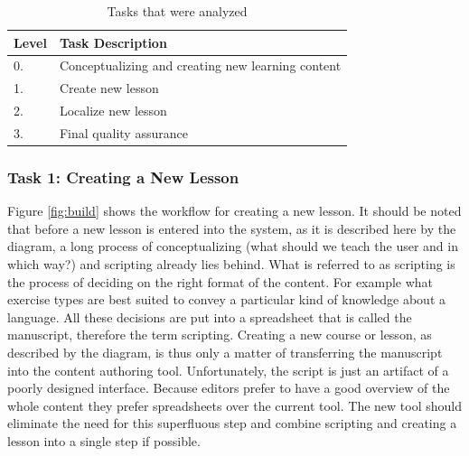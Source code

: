 \begin{table}[h]
\centering
\begin{tabular}{|l|l|}
\hline
\rowcolor[HTML]{EFEFEF}
{\bf Level} & {\bf Task Description}      \\ \hline
0. & Conceptualizing and creating new learning content \\ \hline
1. & Create new lesson           \\
2. & Localize new lesson         \\
3. & Final quality assurance        \\ \hline
\end{tabular}
\caption{Tasks that were analyzed}
\label{table:analyzed-tasks}
\end{table}

\subsubsection{Task 1: Creating a New Lesson} \label{sec:task1}
Figure \ref{fig:build} shows the workflow for creating a new lesson. It should be noted that before a new lesson is entered into the system, as it is described here by the diagram, a long process of conceptualizing (what should we teach the user and in which way?) and scripting already lies behind. What is referred to as scripting is the process of deciding on the right format of the content. For example what exercise types are best suited to convey a particular kind of knowledge about a language. All these decisions are put into a spreadsheet that is called the manuscript, therefore the term scripting. Creating a new course or lesson, as described by the diagram, is thus only a matter of transferring the manuscript into the content authoring tool. Unfortunately, the script is just an artifact of a poorly designed interface. Because editors prefer to have a good overview of the whole content they prefer spreadsheets over the current tool. The new tool should eliminate the need for this superfluous step and combine scripting and creating a lesson into a single step if possible.


